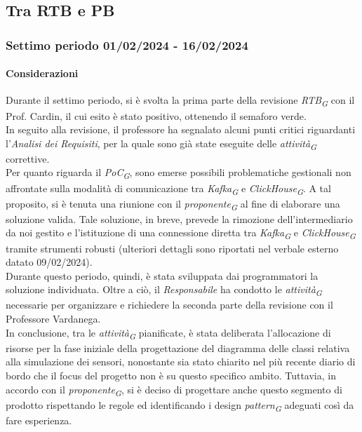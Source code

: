 \subsection{Tra RTB e PB}
\subsubsection{Settimo periodo  01/02/2024 - 16/02/2024}
\paragraph{Considerazioni}
Durante il settimo periodo, si è svolta la prima parte della revisione \textit{RTB}\textsubscript{\textit{G}} con il Prof. Cardin, il cui esito è stato positivo, ottenendo il semaforo verde. \\
In seguito alla revisione, il professore ha segnalato alcuni punti critici riguardanti l'\textit{Analisi dei Requisiti}, per la quale sono già state eseguite delle \textit{attività}\textsubscript{\textit{G}} correttive. \\
Per quanto riguarda il \textit{PoC}\textsubscript{\textit{G}}, sono emerse possibili problematiche gestionali non affrontate sulla modalità di comunicazione tra \textit{Kafka}\textsubscript{\textit{G}} e \textit{ClickHouse}\textsubscript{\textit{G}}. A tal proposito, si è tenuta una riunione con il \textit{proponente}\textsubscript{\textit{G}} al fine di elaborare una soluzione valida. Tale soluzione, in breve, prevede la rimozione dell'intermediario da noi gestito e l'istituzione di una connessione diretta tra \textit{Kafka}\textsubscript{\textit{G}} e \textit{ClickHouse}\textsubscript{\textit{G}} tramite strumenti robusti (ulteriori dettagli sono riportati nel verbale esterno datato 09/02/2024). \\
Durante questo periodo, quindi, è stata sviluppata dai programmatori la soluzione individuata. Oltre a ciò, il \textit{Responsabile} ha condotto le \textit{attività}\textsubscript{\textit{G}} necessarie per organizzare e richiedere la seconda parte della revisione con il Professore Vardanega. \\
In conclusione, tra le \textit{attività}\textsubscript{\textit{G}} pianificate, è stata deliberata l'allocazione di risorse per la fase iniziale della progettazione del diagramma delle classi relativa alla simulazione dei sensori, nonostante sia stato chiarito nel più recente diario di bordo che il focus del progetto non è su questo specifico ambito. Tuttavia, in accordo con il \textit{proponente}\textsubscript{\textit{G}}, si è deciso di progettare anche questo segmento di prodotto rispettando le regole ed identificando i design \textit{pattern}\textsubscript{\textit{G}} adeguati così da fare esperienza.
   
